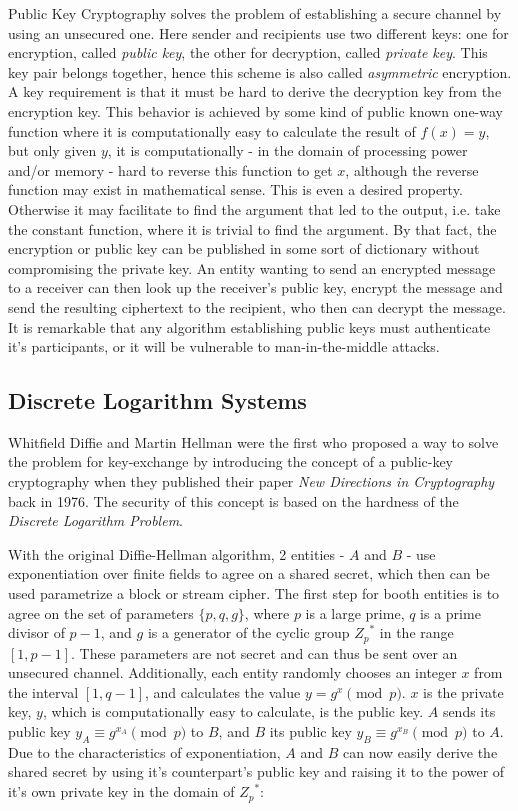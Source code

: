 Public Key Cryptography solves the problem of establishing a secure channel by using an unsecured one.
Here sender and recipients use two different keys: one for encryption, called \textit{public key}, the other
for decryption, called \textit{private key}. This key pair belongs together, hence this scheme is also called \textit{asymmetric} encryption. A key requirement
is that it must be hard
to derive the decryption key from the encryption key. This behavior is achieved by some kind of public known one-way function where it is computationally
easy to calculate the result of $f(x) = y$, but only given $y$, it is computationally - in the domain of processing power and/or memory - hard
to reverse this function to get $x$, although the reverse function may exist in mathematical sense. This is even a desired property. Otherwise
it may facilitate to find the argument that led to the output, i.e. take the constant function, where it is trivial to find the argument.
By that fact, the encryption or public key can be published in some sort of dictionary without compromising the private key. An entity wanting to
send an encrypted message to a receiver can then look up the receiver's public key, encrypt the message and send the resulting
ciphertext to the recipient, who then can decrypt the message. It is remarkable that any algorithm establishing public keys must authenticate it's 
participants, or it will be vulnerable to man-in-the-middle attacks.

\subsection{Discrete Logarithm Systems}

Whitfield Diffie and Martin Hellman were the first who proposed a way to solve the problem for key-exchange by introducing the concept of 
a public-key cryptography when they published their paper \textit{New Directions in Cryptography} back in 1976. The security of this concept
is based on the hardness of the \textit{Discrete Logarithm Problem}. 

With the original Diffie-Hellman algorithm, 2 entities - $A$ and $B$ - use exponentiation over finite fields to agree on a shared secret, which
then can be used parametrize a block or stream cipher. The first step for booth entities is to agree on the set of parameters $\{p, q, g\}$, where $p$ is a 
large prime, $q$ is a prime divisor of $p-1$, and $g$ is a generator of the cyclic group ${Z_p}^*$ in the range $[1, p-1]$. These parameters are not secret and
can thus be sent over an unsecured channel.
Additionally, each entity randomly chooses an integer $x$ from the interval $[1, q-1]$, and calculates the value  $y = g^x \pmod p$. $x$ is the private key,
$y$, which is computationally easy to calculate, is the public key. $A$ sends its public key $y_A \equiv g^{x_A} \pmod p$ to $B$, and $B$ its public key
$y_B \equiv g^{x_B} \pmod p$ to $A$. Due to the characteristics of exponentiation, $A$ and $B$ can now easily derive the shared secret by using it's counterpart's
public key and raising it to the power of it's own private key in the domain of ${Z_p}^*$:


